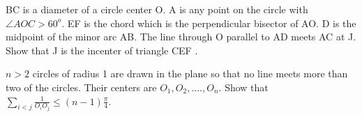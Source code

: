 \item BC is a diameter of a circle center O. A is any point on the circle with $\angle AOC > 60^{o}$. EF is the chord which is the perpendicular bisector of AO. D is the midpoint of the minor arc AB. The line through O parallel to AD meets AC at J. Show that J is the incenter of triangle CEF .\\

\item $n > 2$ circles of radius 1 are drawn in the plane so that no line meets more than two of the circles. Their centers are $O_1, O_2, .... , O_n$. Show that $\sum_{i<j}\frac{1}{O_iO_j}\leq (n-1)\frac{\pi}{4}$.

